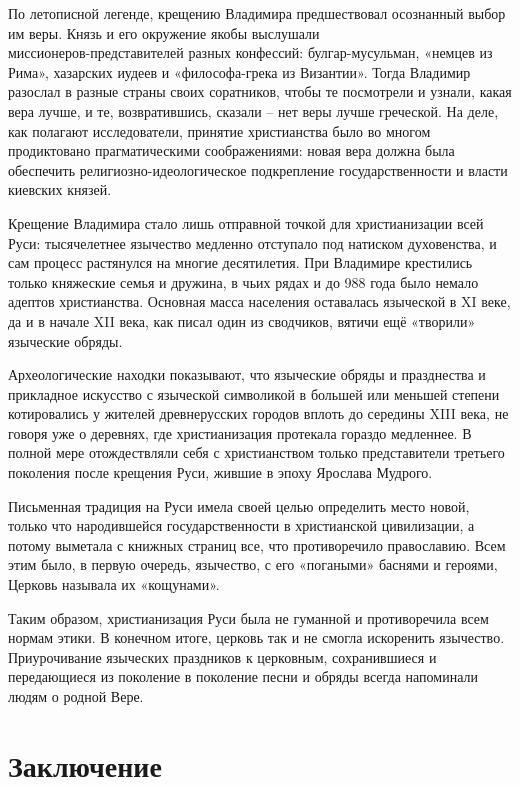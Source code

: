 \documentclass[a4paper, 12pt]{report}
\begin{document}
По летописной легенде, крещению Владимира предшествовал осознанный выбор им веры. Князь и его окружение якобы выслушали \\миссионеров-представителей разных конфессий: булгар-мусульман, «немцев из Рима», хазарских иудеев и «философа-грека из Византии». Тогда Владимир разослал в разные страны своих соратников, чтобы те посмотрели и узнали, какая вера лучше, и те, возвратившись, сказали – нет веры лучше греческой. На деле, как полагают исследователи, принятие христианства было во многом продиктовано прагматическими соображениями: новая вера должна была обеспечить религиозно-идеологическое подкрепление государственности и власти киевских князей.

Крещение Владимира стало лишь отправной точкой для христианизации всей Руси: тысячелетнее язычество медленно отступало под натиском духовенства, и сам процесс растянулся на многие десятилетия. При Владимире крестились только княжеские семья и дружина, в чьих рядах и до 988 года было немало адептов христианства. Основная масса населения оставалась языческой в XI веке, да и в начале XII века, как писал один из сводчиков, вятичи ещё «творили» языческие обряды. 

Археологические находки показывают, что языческие обряды и празднества и прикладное искусство с языческой символикой в большей или меньшей степени котировались у жителей древнерусских городов вплоть до середины XIII века, не говоря уже о деревнях, где христианизация протекала гораздо медленнее. В полной мере отождествляли себя с христианством только представители третьего поколения после крещения Руси, жившие в эпоху Ярослава Мудрого.



Письменная традиция на Руси имела своей целью определить место новой, только что народившейся государственности в христианской цивилизации, а потому выметала с книжных страниц все, что противоречило православию. Всем этим было, в первую очередь, язычество, с его «погаными» баснями и героями, Церковь называла их «кощунами». 

Таким образом, христианизация Руси была не гуманной и противоречила всем нормам этики. В конечном итоге, церковь так и не смогла искоренить язычество. Приурочивание языческих праздников к церковным, сохранившиеся и передающиеся из поколение в поколение песни и обряды всегда напоминали людям о родной Вере.

\chapter*{Заключение}
\end{document}
